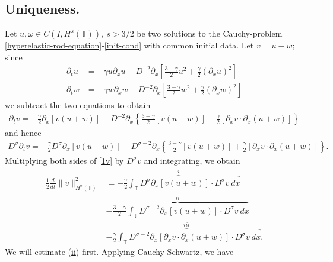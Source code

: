 \documentclass[12pt,reqno]{amsart}
\newcommand{\p}{\partial}
\newcommand{\ci}{\mathbb{T}}
\theoremstyle{plain}  %
\theoremstyle{definition}
\begin{document}
\begin{appendices}
	\subsection{Uniqueness.}
	Let $u,\omega \in C(I, H^s(\ci)), \ s > 3/2$ be two solutions to the
	Cauchy-problem \eqref{hyperelastic-rod-equation}-\eqref{init-cond} with
	common initial data. Let $v=u-w$; since
	\begin{align*}
		\p_t u 
		& = - \gamma u \p_x u - D^{-2} \p_x \left[ \frac{3-\gamma}{2} u^2 +
		\frac{\gamma}{2}\left( \p_x u \right)^2 \right]
		\\
		\p_t w & = -\gamma w \p_x w - D^{-2} \p_x \left[
		\frac{3-\gamma}{2} w^2 + \frac{\gamma}{2}(\p_x w)^2 
		\right]
	\end{align*}
	we subtract the two equations to obtain 
	\begin{equation*}
		\begin{split}
			\p_t v
			= -\frac{\gamma}{2} \p_x [v(u + w)] - D^{-2} \p_x \left\{
			\frac{3-\gamma}{2}[v(u+w)] + \frac{\gamma}{2}[\p_x v \cdot \p_x (u+w)]
			\right\}
		\end{split}
	\end{equation*}
	and hence
	\begin{equation}
		\begin{split}
			D^\sigma \p_t v = -\frac{\gamma}{2} D^\sigma \p_x [v(u+w)] - D^{\sigma -2} \p_x
			\left\{ \frac{3-\gamma}{2} [v(u+w)] + \frac{\gamma}{2} [\p_x v
			\cdot \p_x
			(u+w)]
			\right\}.
			\label{1v}
		\end{split}
	\end{equation}
	Multiplying both sides of \eqref{1v} by $D^\sigma v$ and integrating, we obtain
	\begin{equation}
		\begin{split}
			\frac{1}{2} \frac{d}{dt} \|v\|_{H^\sigma(\ci)}^2
			& =  \overbrace{-\frac{\gamma}{2} \int_{\ci} D^\sigma \p_x [v(u+w)] \cdot
			D^\sigma v \ dx}^i
			\\
			& \overbrace{- \frac{3-\gamma}{2} \int_{\ci}  D^{\sigma -2}
			\p_x[v(u+w)] \cdot
			D^\sigma v \ dx}^{ii} 
			\\
			& - \overbrace{\frac{\gamma}{2} \int_{\ci} D^{\sigma -2} \p_x [ \p_x v
			\cdot \p_x (u+w)]\cdot D^\sigma v \ dx }^{iii}.
			\label{2v}
		\end{split}
	\end{equation}
	We will estimate (\hyperref[2v]{ii}) first.
	Applying Cauchy-Schwartz, we have 
	\begin{equation*}
		\begin{split}

\end{split}
\end{equation*}
\end{appendices}
\end{document}
